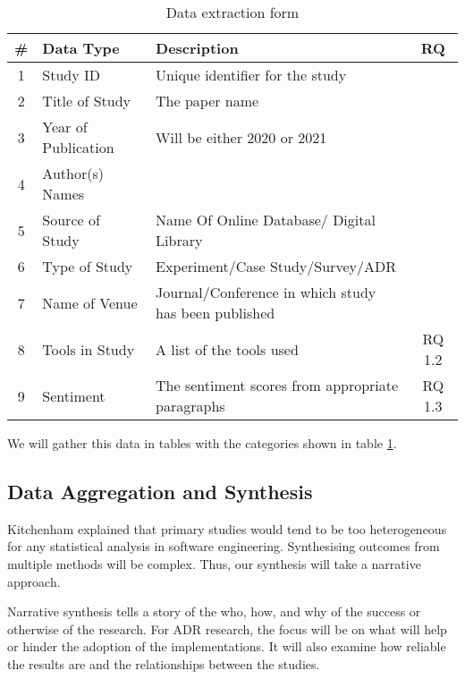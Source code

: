 \begin{table}
	\centering
	\begin{tabular}{|c | l | l | c |} 
		\hline
		\#& Data Type           & Description                                          & RQ     \\ \hline
		\hline
        1 & Study ID            & Unique identifier for the study                      &        \\ \hline
        2 & Title of Study      & The paper name                                       &        \\ \hline
        3 & Year of Publication & Will be either 2020 or 2021                          &        \\ \hline
        4 & Author(s) Names     &                                                      &        \\ \hline
        5 & Source of Study     & Name Of Online Database/ Digital Library             &        \\ \hline
        6 & Type of Study       & Experiment/Case Study/Survey/ADR            &        \\ \hline
        7 & Name of Venue       & Journal/Conference in which study has been published &        \\ \hline
        8 & Tools in Study      & A list of the tools used                             & RQ 1.2 \\ \hline
        9 & Sentiment           & The sentiment scores from appropriate paragraphs     & RQ 1.3 \\ \hline		
	\end{tabular}	
	\caption{Data extraction form}
    \label{table:Data_Extraction_Form}
\end{table}

We will gather this data in tables with the categories shown in table \ref{table:Data_Extraction_Form}.

\subsection{Data Aggregation and Synthesis}
Kitchenham\cite{kitchenham2015evidence} explained that primary studies would tend to be too heterogeneous for any statistical analysis in software engineering. 
Synthesising outcomes from multiple methods will be complex.
Thus, our synthesis will take a narrative approach.

Narrative synthesis tells a story of the who, how, and why of the success or otherwise of the research.
For ADR research, the focus will be on what will help or hinder the adoption of the implementations.
It will also examine how reliable the results are and the relationships between the studies.

